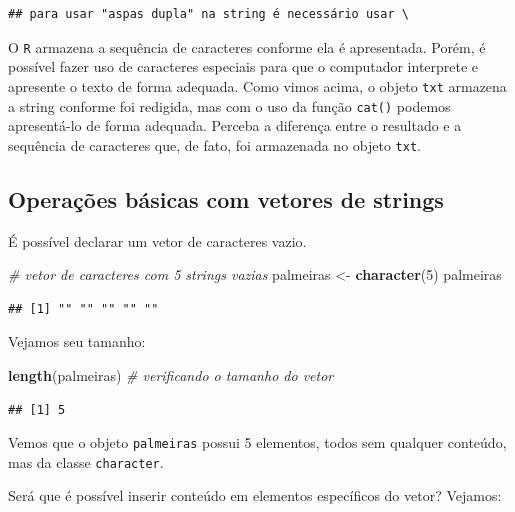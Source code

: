 \documentclass[]{book}
\newenvironment{Shaded}{\begin{snugshade}}{\end{snugshade}}
\newcommand{\CommentTok}[1]{\textcolor[rgb]{0.56,0.35,0.01}{\textit{#1}}}
\newcommand{\DecValTok}[1]{\textcolor[rgb]{0.00,0.00,0.81}{#1}}
\newcommand{\KeywordTok}[1]{\textcolor[rgb]{0.13,0.29,0.53}{\textbf{#1}}}
\newcommand{\NormalTok}[1]{#1}
\newcommand{\StringTok}[1]{\textcolor[rgb]{0.31,0.60,0.02}{#1}}
\begin{document}
\begin{verbatim}
## para usar "aspas dupla" na string é necessário usar \
\end{verbatim}

O \texttt{R} armazena a sequência de caracteres conforme ela é apresentada. Porém, é possível fazer uso de caracteres especiais para que o computador interprete e apresente o texto de forma adequada. Como vimos acima, o objeto \texttt{txt} armazena a string conforme foi redigida, mas com o uso da função \texttt{cat()} podemos apresentá-lo de forma adequada. Perceba a diferença entre o resultado e a sequência de caracteres que, de fato, foi armazenada no objeto \texttt{txt}.

\hypertarget{operauxe7uxf5es-buxe1sicas-com-vetores-de-strings}{%
\subsection{Operações básicas com vetores de strings}\label{operauxe7uxf5es-buxe1sicas-com-vetores-de-strings}}

É possível declarar um vetor de caracteres vazio.

\begin{Shaded}
\begin{Highlighting}[]
\CommentTok{# vetor de caracteres com 5 strings vazias}
\NormalTok{palmeiras <-}\StringTok{ }\KeywordTok{character}\NormalTok{(}\DecValTok{5}\NormalTok{)}
\NormalTok{palmeiras}
\end{Highlighting}
\end{Shaded}

\begin{verbatim}
## [1] "" "" "" "" ""
\end{verbatim}

Vejamos seu tamanho:

\begin{Shaded}
\begin{Highlighting}[]
\KeywordTok{length}\NormalTok{(palmeiras)  }\CommentTok{# verificando o tamanho do vetor}
\end{Highlighting}
\end{Shaded}

\begin{verbatim}
## [1] 5
\end{verbatim}

Vemos que o objeto \texttt{palmeiras} possui 5 elementos, todos sem qualquer conteúdo, mas da classe \texttt{character}.

Será que é possível inserir conteúdo em elementos específicos do vetor? Vejamos:
\end{document}

